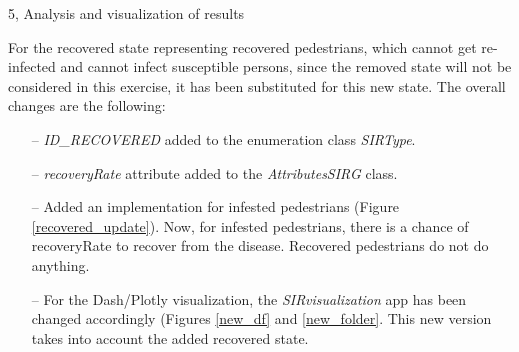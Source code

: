 \documentclass[10pt,a4paper]{article}
\begin{document}
\begin{task}{5, Analysis and visualization of results}


For the recovered state representing recovered pedestrians, which cannot get re-infected and cannot infect susceptible persons, since the removed state will not be considered in this exercise, it has been substituted for this new state. The overall changes are the following:
\begin{itemize}
    \item[--] \textit{ID\_RECOVERED} added to the enumeration class \textit{SIRType}.
    \item[--] \textit{recoveryRate} attribute added to the \textit{AttributesSIRG} class.
    \item[--] Added an implementation for infested pedestrians (Figure \ref{recovered_update}). Now, for infested pedestrians, there is a chance of recoveryRate to recover from the disease. Recovered pedestrians do not do anything.
    
    \item[--] For the Dash/Plotly visualization, the \textit{SIRvisualization} app has been changed accordingly (Figures \ref{new_df} and \ref{new_folder}. This new version takes into account the added recovered state.

\end{itemize}{}


\end{task}
\end{document}
